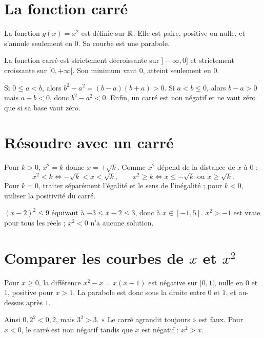 \documentclass[../cours_2de.tex]{subfiles}
\begin{document}
\section{La fonction carré}
La fonction $g(x)=x^2$ est définie sur $\mathbb{R}$. Elle est paire, positive ou nulle, et s'annule seulement en $0$. Sa courbe est une parabole.
\begin{theoreme}
La fonction carré est strictement décroissante sur $]-\infty,0]$ et strictement croissante sur $[0,+\infty[$. Son minimum vaut $0$, atteint seulement en $0$.
\end{theoreme}
\begin{demonstration}
Si $0\leq a<b$, alors $b^2-a^2=(b-a)(b+a)>0$.
Si $a<b\leq0$, alors $b-a>0$ mais $a+b<0$, donc $b^2-a^2<0$.
Enfin, un carré est non négatif et ne vaut zéro que si sa base vaut zéro.
\end{demonstration}
\begin{center}
\end{center}
\section{Résoudre avec un carré}
Pour $k>0$, $x^2=k$ donne $x=\pm\sqrt k$.
Comme $x^2$ dépend de la distance de $x$ à $0$ :
\[
x^2<k\Leftrightarrow-\sqrt k<x<\sqrt k,\qquad
x^2\geq k\Leftrightarrow x\leq-\sqrt k\text{ ou }x\geq\sqrt k.
\]
Pour $k=0$, traiter séparément l'égalité et le sens de l'inégalité ; pour $k<0$, utiliser la positivité du carré.
\begin{exemple}
$(x-2)^2\leq9$ équivaut à $-3\leq x-2\leq3$, donc à $x\in[-1,5]$.
$x^2>-1$ est vraie pour tous les réels ; $x^2<0$ n'a aucune solution.
\end{exemple}
\section{Comparer les courbes de $x$ et $x^2$}
\begin{demonstration}
Pour $x\geq0$, la différence $x^2-x=x(x-1)$ est négative sur $]0,1[$, nulle en $0$ et $1$, positive pour $x>1$.
La parabole est donc sous la droite entre $0$ et $1$, et au-dessus après $1$.
\end{demonstration}
Ainsi $0{,}2^2<0{,}2$, mais $3^2>3$. « Le carré agrandit toujours » est faux.
Pour $x<0$, le carré est non négatif tandis que $x$ est négatif : $x^2>x$.
\end{document}
